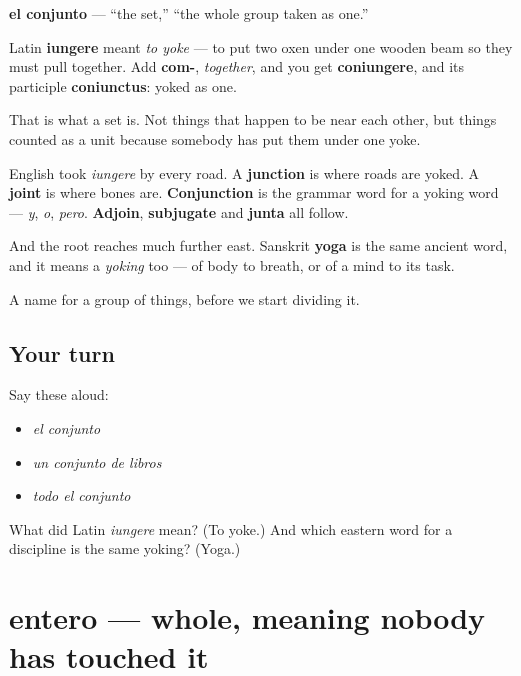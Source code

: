 \begin{cousinweb}
\textbf{el conjunto} — \textquotedblleft{}the set,\textquotedblright{} \textquotedblleft{}the whole group taken as one.\textquotedblright{}

Latin \textbf{iungere} meant \emph{to yoke} — to put two oxen under one wooden beam so they must pull together. Add \textbf{com-}, \emph{together}, and you get \textbf{coniungere}, and its participle \textbf{coniunctus}: yoked as one.

That is what a set is. Not things that happen to be near each other, but things counted as a unit because somebody has put them under one yoke.

English took \emph{iungere} by every road. A \textbf{junction} is where roads are yoked. A \textbf{joint} is where bones are. \textbf{Conjunction} is the grammar word for a yoking word — \emph{y}, \emph{o}, \emph{pero}. \textbf{Adjoin}, \textbf{subjugate} and \textbf{junta} all follow.

And the root reaches much further east. Sanskrit \textbf{yoga} is the same ancient word, and it means a \emph{yoking} too — of body to breath, or of a mind to its task.
\end{cousinweb}

\begin{grammarlens}[title={What you've built}]
A name for a group of things, before we start dividing it.
\end{grammarlens}

\subsection*{Your turn}
Say these aloud:

\begin{itemize}
\raggedright
  \item \emph{el conjunto}
  \item \emph{un conjunto de libros}
  \item \emph{todo el conjunto}
\end{itemize}

\begin{tcolorbox}[breakable,colback=teal!4,colframe=teal!35!black,title={Before you move on}]
What did Latin \emph{iungere} mean? (To yoke.) And which eastern word for a discipline is the same yoking? (Yoga.)
\end{tcolorbox}
\section[entero]{entero — whole, meaning nobody has touched it}

